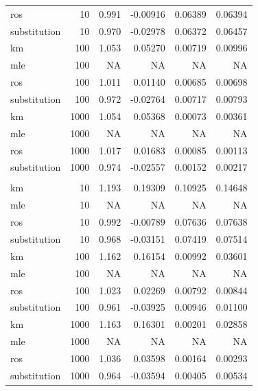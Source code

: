 \documentclass[12pt, twoside]{amherstthesis}
\begin{document}
\begin{table}
\begin{tabular}[t]{lrrrrr}
\hspace{1em}ros & 10 & 0.991 & -0.00916 & 0.06389 & 0.06394\\
\hspace{1em}substitution & 10 & 0.970 & -0.02978 & 0.06372 & 0.06457\\
\hspace{1em}km & 100 & 1.053 & 0.05270 & 0.00719 & 0.00996\\
\hspace{1em}mle & 100 & NA & NA & NA & \vphantom{1} NA\\
\hspace{1em}ros & 100 & 1.011 & 0.01140 & 0.00685 & 0.00698\\
\hspace{1em}substitution & 100 & 0.972 & -0.02764 & 0.00717 & 0.00793\\
\hspace{1em}km & 1000 & 1.054 & 0.05368 & 0.00073 & 0.00361\\
\hspace{1em}mle & 1000 & NA & NA & NA & \vphantom{1} NA\\
\hspace{1em}ros & 1000 & 1.017 & 0.01683 & 0.00085 & 0.00113\\
\hspace{1em}substitution & 1000 & 0.974 & -0.02557 & 0.00152 & 0.00217\\
\addlinespace[1em]
\multicolumn{6}{l}{\textbf{Censoring Rate = 0.5}}\\
\hspace{1em}km & 10 & 1.193 & 0.19309 & 0.10925 & 0.14648\\
\hspace{1em}mle & 10 & NA & NA & NA & NA\\
\hspace{1em}ros & 10 & 0.992 & -0.00789 & 0.07636 & 0.07638\\
\hspace{1em}substitution & 10 & 0.968 & -0.03151 & 0.07419 & 0.07514\\
\hspace{1em}km & 100 & 1.162 & 0.16154 & 0.00992 & 0.03601\\
\hspace{1em}mle & 100 & NA & NA & NA & NA\\
\hspace{1em}ros & 100 & 1.023 & 0.02269 & 0.00792 & 0.00844\\
\hspace{1em}substitution & 100 & 0.961 & -0.03925 & 0.00946 & 0.01100\\
\hspace{1em}km & 1000 & 1.163 & 0.16301 & 0.00201 & 0.02858\\
\hspace{1em}mle & 1000 & NA & NA & NA & NA\\
\hspace{1em}ros & 1000 & 1.036 & 0.03598 & 0.00164 & 0.00293\\
\hspace{1em}substitution & 1000 & 0.964 & -0.03594 & 0.00405 & 0.00534\\
\bottomrule
\end{tabular}
\end{table}
\end{document}
